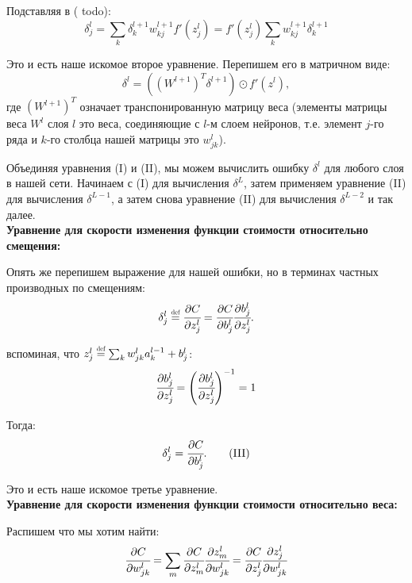 Подставляя в ({\color{red} todo}):
\begin{equation*}
    \delta_j^l = \sum_k \delta_k^{l+1} w_{kj}^{l+1} f'(z_j^l) = f'(z_j^l) \sum_k w_{kj}^{l+1} \delta_k^{l+1}
\end{equation*}

Это и есть наше искомое второе уравнение. Перепишем его в матричном виде:
\begin{equation*}
    \delta^l = ((W^{l+1})^T \delta^{l+1}) \odot f'(z^l),
    \tag{II}
\end{equation*}
где $(W^{l+1})^T$ означает транспонированную матрицу веса 
(элементы матрицы веса $W^l$ слоя $l$ это веса, соединяющие с $l$-м слоем нейронов, 
т.е. элемент $j$-го ряда и $k$-го столбца нашей матрицы это $w_{jk}^l$).

Объединяя уравнения (I) и (II), мы можем вычислить ошибку $\delta^l$ для любого 
слоя в нашей сети. Начинаем с (I) для вычисления $\delta^L$, затем применяем 
уравнение (II) для вычисления $\delta^{L-1}$, а затем снова уравнение (II) для 
вычисления $\delta^{L-2}$ и так далее.\\

\noindent\textbf{Уравнение для скорости изменения функции стоимости относительно смещения:}

Опять же перепишем выражение для нашей ошибки, но в терминах частных производных 
по смещениям:
\begin{equation*}
    \delta_j^l \defeq \cfrac{\partial C}{\partial z_j^l} = 
    \cfrac{\partial C}{\partial b_j^l} \cfrac{\partial b_j^l}{\partial z_j^l}.
\end{equation*}

вспоминая, что $z_j^l \defeq \sum_k w_{jk}^l a_k^{l-1} + b_j^l$:
\begin{equation*}
    \cfrac{\partial b_j^l}{\partial z_j^l} = 
    \left( \cfrac{\partial b_j^l}{\partial z_j^l} \right)^{-1} = 1
\end{equation*}

Тогда:
\begin{equation*}
    \delta_j^l = \cfrac{\partial C}{\partial b_j^l}.
    \tag{III}
\end{equation*}

Это и есть наше искомое третье уравнение.\\

\noindent\textbf{Уравнение для скорости изменения функции стоимости относительно веса:}

Распишем что мы хотим найти:
\begin{equation}
    \cfrac{\partial C}{\partial w_{jk}^l} = \sum_m \cfrac{\partial C}{\partial z_m^l} \cfrac{\partial z_m^l}{\partial w_{jk}^l} = \cfrac{\partial C}{\partial z_j^l} \cfrac{\partial z_j^l}{\partial w_{jk}^l}
\end{equation}

